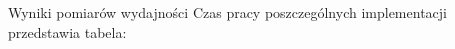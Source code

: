 \documentclass[12pt]{article}
\begin{document}
 
 {\Large Wyniki pomiarów wydajności }
 Czas pracy poszczególnych implementacji przedstawia tabela:
\end{document}
